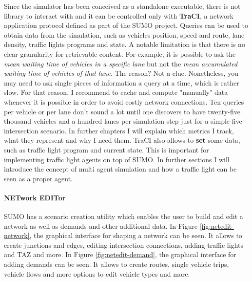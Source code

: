 Since the simulator has been conceived as a standalone executable, there is not library to interact with and it can be controlled only with \textbf{TraCI}, a network application protocol defined as part of the SUMO project. Queries can be used to obtain data from the simulation, such as vehicles position, speed and route, lane density, traffic lights programs and state. A notable limitation is that there is no clear granularity for retrievable content. For example, it is possible to ask the \textit{mean waiting time of vehicles in a specific lane} but not the \textit{mean accumulated waiting time of vehicles of that lane}. The reason? Not a clue. Nonetheless, you may need to ask single pieces of information a query at a time, which is rather slow. For that reason, I recommend to cache and compute "manually" data whenever it is possible in order to avoid costly network connections. Ten queries per vehicle or per lane don't sound a lot until one discovers to have twenty-five thousand vehicles and a hundred lanes per simulation step just for a simple five intersection scenario. In further chapters I will explain which metrics I track, what they represent and why I need them. TraCI also allows to \textbf{set} some data, such as traffic light program and current state. This is important for implementing traffic light agents on top of SUMO. In further sections I will introduce the concept of multi agent simulation and how a traffic light can be seen as a proper agent.

\paragraph{\textbf{NET}work \textbf{EDIT}or}

SUMO has a scenario creation utility which enables the user to build and edit a network as well as demands and other additional data.
In Figure \ref{fig:netedit-network}, the graphical interface for shaping a network can be seen. It allows to create junctions and edges, editing intersection connections, adding traffic lights and TAZ and more.
In Figure \ref{fig:netedit-demand}, the graphical interface for adding demands can be seen. It allows to create routes, single vehicle trips, vehicle flows and more options to edit vehicle types and more.


